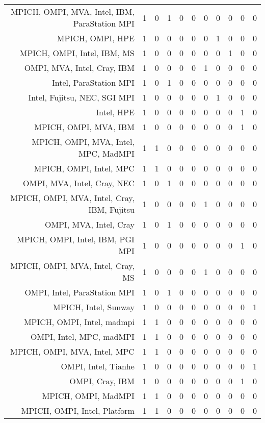 {\begin{landscape}
\begin{longtable}[htb]{r|c|c|c|c|c|c|c|c|c|c}
{MPICH, OMPI, MVA, Intel, IBM, ParaStation MPI} & 1 & 0 & 1 & 0 & 0 & 0 & 0 & 0 & 0 & 0 \\%
{MPICH, OMPI, HPE} & 1 & 0 & 0 & 0 & 0 & 0 & 1 & 0 & 0 & 0 \\%
{MPICH, OMPI, Intel, IBM, MS} & 1 & 0 & 0 & 0 & 0 & 0 & 0 & 1 & 0 & 0 \\%
{OMPI, MVA, Intel, Cray, IBM} & 1 & 0 & 0 & 0 & 0 & 1 & 0 & 0 & 0 & 0 \\%
{Intel, ParaStation MPI} & 1 & 0 & 1 & 0 & 0 & 0 & 0 & 0 & 0 & 0 \\%
{Intel, Fujitsu, NEC, SGI MPI} & 1 & 0 & 0 & 0 & 0 & 0 & 1 & 0 & 0 & 0 \\%
{Intel, HPE} & 1 & 0 & 0 & 0 & 0 & 0 & 0 & 0 & 1 & 0 \\%
{MPICH, OMPI, MVA, IBM} & 1 & 0 & 0 & 0 & 0 & 0 & 0 & 0 & 1 & 0 \\%
{MPICH, OMPI, MVA, Intel, MPC, MadMPI} & 1 & 1 & 0 & 0 & 0 & 0 & 0 & 0 & 0 & 0 \\%
{MPICH, OMPI, Intel, MPC} & 1 & 1 & 0 & 0 & 0 & 0 & 0 & 0 & 0 & 0 \\%
{OMPI, MVA, Intel, Cray, NEC} & 1 & 0 & 1 & 0 & 0 & 0 & 0 & 0 & 0 & 0 \\%
{MPICH, OMPI, MVA, Intel, Cray, IBM, Fujitsu} & 1 & 0 & 0 & 0 & 0 & 1 & 0 & 0 & 0 & 0 \\%
{OMPI, MVA, Intel, Cray} & 1 & 0 & 1 & 0 & 0 & 0 & 0 & 0 & 0 & 0 \\%
{MPICH, OMPI, Intel, IBM, PGI MPI} & 1 & 0 & 0 & 0 & 0 & 0 & 0 & 0 & 1 & 0 \\%
{MPICH, OMPI, MVA, Intel, Cray, MS} & 1 & 0 & 0 & 0 & 0 & 1 & 0 & 0 & 0 & 0 \\%
{OMPI, Intel, ParaStation MPI} & 1 & 0 & 1 & 0 & 0 & 0 & 0 & 0 & 0 & 0 \\%
{MPICH, Intel, Sunway} & 1 & 0 & 0 & 0 & 0 & 0 & 0 & 0 & 0 & 1 \\%
{MPICH, OMPI, Intel, madmpi} & 1 & 1 & 0 & 0 & 0 & 0 & 0 & 0 & 0 & 0 \\%
{OMPI, Intel, MPC, madMPI} & 1 & 1 & 0 & 0 & 0 & 0 & 0 & 0 & 0 & 0 \\%
{MPICH, OMPI, MVA, Intel, MPC} & 1 & 1 & 0 & 0 & 0 & 0 & 0 & 0 & 0 & 0 \\%
{OMPI, Intel, Tianhe} & 1 & 0 & 0 & 0 & 0 & 0 & 0 & 0 & 0 & 1 \\%
{OMPI, Cray, IBM} & 1 & 0 & 0 & 0 & 0 & 0 & 0 & 0 & 1 & 0 \\%
{MPICH, OMPI, MadMPI} & 1 & 1 & 0 & 0 & 0 & 0 & 0 & 0 & 0 & 0 \\%
{MPICH, OMPI, Intel, Platform} & 1 & 1 & 0 & 0 & 0 & 0 & 0 & 0 & 0 & 0 \\%

\end{longtable}
\end{landscape}}
